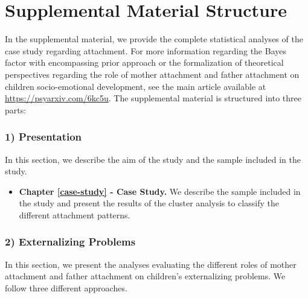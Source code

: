 \documentclass[
]{book}
\providecommand{\tightlist}{%
  \setlength{\itemsep}{0pt}\setlength{\parskip}{0pt}}
\begin{document}
\hypertarget{supplemental-material-structure}{%
\section*{Supplemental Material Structure}\label{supplemental-material-structure}}

In the supplemental material, we provide the complete statistical analyses of the case study regarding attachment. For more information regarding the Bayes factor with encompassing prior approach or the formalization of theoretical perspectives regarding the role of mother attachment and father attachment on children socio-emotional development, see the main article available at \url{https://psyarxiv.com/6kc5u}. The supplemental material is structured into three parts:

\hypertarget{presentation}{%
\subsubsection*{1) Presentation}\label{presentation}}

In this section, we describe the aim of the study and the sample included in the study.

\begin{itemize}
\tightlist
\item
  \textbf{Chapter \ref{case-study} - Case Study.} We describe the sample included in the study and present the results of the cluster analysis to classify the different attachment patterns.
\end{itemize}

\hypertarget{externalizing-problems}{%
\subsubsection*{2) Externalizing Problems}\label{externalizing-problems}}

In this section, we present the analyses evaluating the different roles of mother attachment and father attachment on children's externalizing problems. We follow three different approaches.
\end{document}
